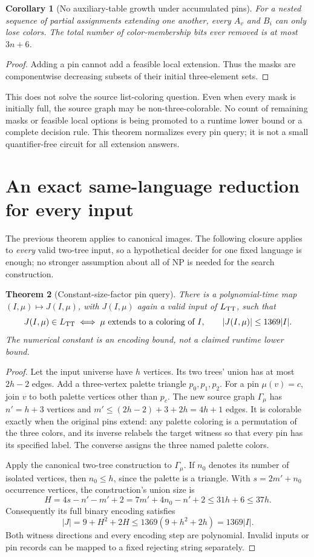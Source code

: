 \documentclass[11pt]{article}
\newtheorem{theorem}{Theorem}
\newtheorem{corollary}[theorem]{Corollary}
\begin{document}
\begin{corollary}[No auxiliary-table growth under accumulated pins]
For a nested sequence of partial assignments extending one another, every
$A_v$ and $B_i$ can only lose colors. The total number of color-membership
bits ever removed is at most $3n+6$.
\end{corollary}
\begin{proof}
Adding a pin cannot add a feasible local extension. Thus the masks are
componentwise decreasing subsets of their initial three-element sets.
\end{proof}

This does not solve the source list-coloring question. Even when every mask
is initially full, the source graph may be non-three-colorable. No count of
remaining masks or feasible local options is being promoted to a runtime
lower bound or a complete decision rule. This theorem normalizes every pin
query; it is not a small quantifier-free circuit for all extension answers.

\section{An exact same-language reduction for every input}
The previous theorem applies to canonical images. The following closure
applies to \emph{every} valid two-tree input, so a hypothetical decider for
one fixed language is enough; no stronger assumption about all of NP is
needed for the search construction.

\begin{theorem}[Constant-size-factor pin query]\label{thm:closure}
There is a polynomial-time map $(I,\mu)\mapsto J(I,\mu)$, with
$J(I,\mu)$ again a valid input of $L_{\rm TT}$, such that
\[
 J(I,\mu)\in L_{\rm TT}
 \iff \mu\text{ extends to a coloring of }I,
 \qquad |J(I,\mu)|\le1369|I|.
\]
The numerical constant is an encoding bound, not a claimed runtime lower bound.
\end{theorem}
\begin{proof}
Let the input universe have $h$ vertices. Its two trees' union has at most
$2h-2$ edges. Add a three-vertex palette triangle $p_0,p_1,p_2$. For a pin
$\mu(v)=c$, join $v$ to both palette vertices other than $p_c$. The new
source graph $\Gamma_\mu$ has $n'=h+3$ vertices and
$m'\le(2h-2)+3+2h=4h+1$ edges. It is colorable exactly when the original
pins extend: any palette coloring is a permutation of the three colors,
and its inverse relabels the target witness so that every pin has its
specified label. The converse assigns the three named palette colors.

Apply the canonical two-tree construction to $\Gamma_\mu$. If $n_0$ denotes
its number of isolated vertices, then $n_0\le h$, since the palette is a
triangle. With $s=2m'+n_0$ occurrence vertices, the construction's union size is
\[
 H=4s-n'-m'+2=7m'+4n_0-n'+2\le31h+6\le37h.
\]
Consequently its full binary encoding satisfies
\[
 |J|=9+H^2+2H\le1369(9+h^2+2h)=1369|I|.
\]
Both witness directions and every encoding step are polynomial. Invalid
inputs or pin records can be mapped to a fixed rejecting string separately.
\end{proof}
\end{document}
